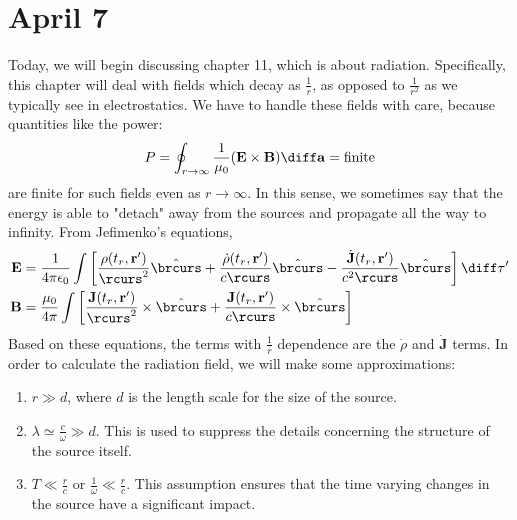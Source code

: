 \section{April 7}
Today, we will begin discussing chapter 11, which is about radiation. Specifically, this chapter will deal
with fields which decay as \( \frac{1}{r} \), as opposed to \( \frac{1}{r^2} \) as we typically see in
electrostatics. We have to handle these fields with care, because quantities like the power:
\[
	P = \oint_{r \to \infty} \frac{1}{\mu_0} (\mathbf{E} \times \mathbf{B}) \diff \mathbf{a} = \text{finite}
\]
are finite for such fields even as \( r \to \infty \). In this sense, we sometimes say that the energy is
able to "detach" away from the sources and propagate all the way to infinity. From Jefimenko's equations, 
\begin{align*}
	\mathbf{E} &= \frac{1}{4\pi \epsilon_0} \int \left[ \frac{\rho(t_r, \mathbf{r}')}{\rcurs^2} \hat{\brcurs}
	+ \frac{\dot \rho (t_r, \mathbf{r}')}{c \rcurs} \hat{\brcurs} - \frac{\dot{\mathbf{J}} (t_r,
\mathbf{r}')}{c^2 \rcurs} \hat{\brcurs}\right] \diff \tau' \\ 
\mathbf{B} &= \frac{\mu_0}{4\pi} \int \left[ \frac{\mathbf{J}(t_r, \mathbf{r}')}{\rcurs^2} \times
\hat{\brcurs} + \frac{\mathbf{J}(t_r, \mathbf{r}')}{c\rcurs} \times \hat{\brcurs}\right] 
\end{align*}
Based on these equations, the terms with \( \frac{1}{r} \) dependence are the \( \dot \rho \) and \(
\dot{\mathbf{J}} \) terms. In order to calculate the radiation field, we will make some approximations:
\begin{enumerate}[label=\arabic*.]
	\item \( r \gg d \), where \( d \) is the length scale for the size of the source.   
	\item \( \lambda \simeq \frac{c}{\omega} \gg d \). This is used to suppress the details concerning the
		structure of the source itself. 
	\item \( T \ll \frac{r}{c} \) or \( \frac{1}{\omega} \ll \frac{r}{c} \). This assumption ensures that the
		time varying changes in the source have a significant impact.  
\end{enumerate}

